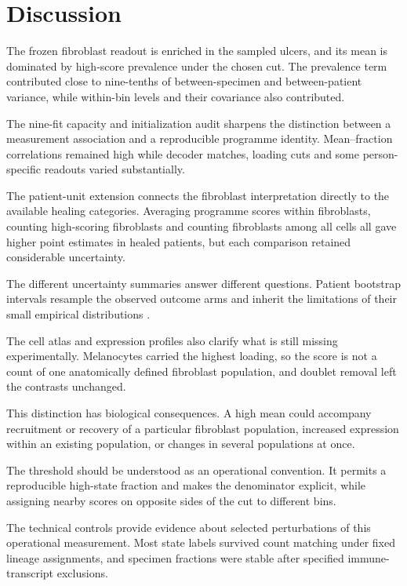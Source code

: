 \documentclass[10pt,a4paper]{article}
\begin{document}
\section{Discussion}

The frozen fibroblast readout is enriched in the sampled ulcers, and its mean is dominated by high-score prevalence under the chosen cut. The prevalence term contributed close to nine-tenths of between-specimen and between-patient variance, while within-bin levels and their covariance also contributed.

The nine-fit capacity and initialization audit sharpens the distinction between a measurement association and a reproducible programme identity. Mean--fraction correlations remained high while decoder matches, loading cuts and some person-specific readouts varied substantially.

The patient-unit extension connects the fibroblast interpretation directly to the available healing categories. Averaging programme scores within fibroblasts, counting high-scoring fibroblasts and counting fibroblasts among all cells all gave higher point estimates in healed patients, but each comparison retained considerable uncertainty.

The different uncertainty summaries answer different questions. Patient bootstrap intervals resample the observed outcome arms and inherit the limitations of their small empirical distributions \citep{efron1993}.

The cell atlas and expression profiles also clarify what is still missing experimentally. Melanocytes carried the highest loading, so the score is not a count of one anatomically defined fibroblast population, and doublet removal left the contrasts unchanged.

This distinction has biological consequences. A high mean could accompany recruitment or recovery of a particular fibroblast population, increased expression within an existing population, or changes in several populations at once.

The threshold should be understood as an operational convention. It permits a reproducible high-state fraction and makes the denominator explicit, while assigning nearby scores on opposite sides of the cut to different bins.

The technical controls provide evidence about selected perturbations of this operational measurement. Most state labels survived count matching under fixed lineage assignments, and specimen fractions were stable after specified immune-transcript exclusions.
\end{document}
